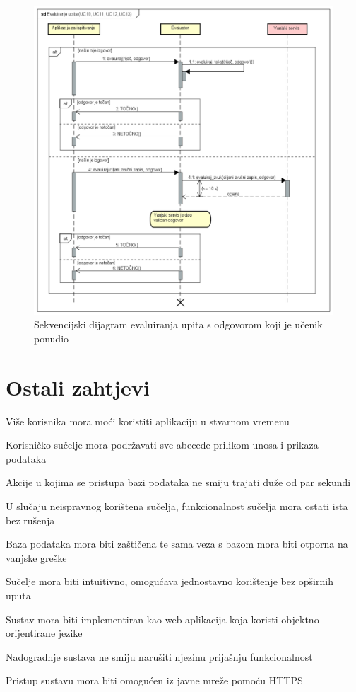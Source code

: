 					\begin{figure}[H]
						\includegraphics[width=\textwidth]{dijagrami/SD_EvaluiranjeUpita.png} %
						\caption{Sekvencijski dijagram evaluiranja upita s odgovorom koji je učenik ponudio}
						\label{fig:SD_EvaluiranjeUpita} %
					\end{figure}
	
			\eject

				
		\section{Ostali zahtjevi}

				\begin{packed_item}
					\item Više korisnika mora moći koristiti aplikaciju u stvarnom vremenu
					\item Korisničko sučelje mora podržavati sve abecede prilikom unosa i prikaza podataka
					\item Akcije u kojima se pristupa bazi podataka ne smiju trajati duže od par sekundi 
					\item U slučaju neispravnog korištena sučelja, funkcionalnost sučelja mora ostati ista bez rušenja
					\item Baza podataka mora biti zaštičena te sama veza s bazom mora biti otporna na vanjske greške
					\item Sučelje mora biti intuitivno, omogućava jednostavno korištenje bez opširnih uputa 
					\item Sustav mora biti implementiran kao web aplikacija koja koristi objektno-orijentirane jezike 
					\item Nadogradnje sustava ne smiju narušiti njezinu prijašnju funkcionalnost
					\item Pristup sustavu mora biti omogućen iz javne mreže pomoću HTTPS
				\end{packed_item}
			 
			 
	
